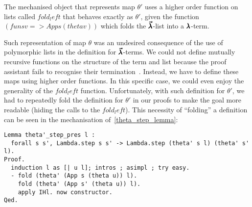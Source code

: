 The mechanised object that represents map $\theta'$ uses a higher order function on lists called \lst$fold_left$ that behaves exactly as $\theta'$, given the function \lst$(fun s v => App s (theta v))$ which folds the $\pmb{\vec \lambda}$-list into a $\pmb{\lambda}$-term.

Such representation of map $\theta$ was an undesired consequence of the use of polymorphic lists in the definition for $\pmb{\vec \lambda}$-terms.
We could not define mutually recursive functions on the structure of the term and list because the proof assistant fails to recognise their termination~\cite{YvesStackOverflow}.
Instead, we have to define these maps using higher order functions.
In this specific case, we could even enjoy the generality of the \lst$fold_left$ function.
Unfortunately, with such definition for $\theta'$, we had to repeatedly fold the definition for $\theta'$ in our proofs to make the goal more readable (hiding the calls to the \lst$fold_left$).
This necessity of ``folding'' a definition can be seen in the mechanisation of~\cref{theta_step_lemma}:
\begin{lstlisting}[language=Coq]
Lemma theta'_step_pres l :
  forall s s', Lambda.step s s' -> Lambda.step (theta' s l) (theta' s' l).
Proof.
  induction l as [| u l]; intros ; asimpl ; try easy.
  - fold (theta' (App s (theta u)) l).
    fold (theta' (App s' (theta u)) l).
    apply IHl. now constructor.
Qed.
\end{lstlisting}


